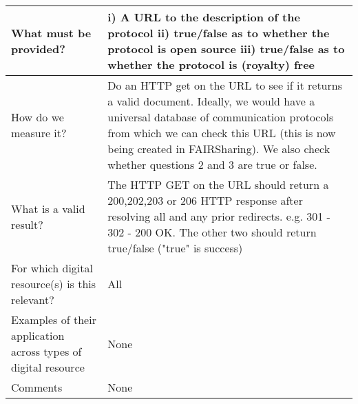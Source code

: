 \documentclass[english]{article}
\begin{document}
\begin{longtable}{|p{5cm}|p{9cm}|}
\hline
What must be provided? &  


i) A URL to the description of the protocol\newline  
ii) true/false as to whether the protocol is open source\newline 
iii) true/false as to whether the protocol is (royalty) free\newline 




\\



\hline
How do we measure it? &  

Do an HTTP get on the URL to see if it returns a valid document. Ideally, we would have a universal database of communication protocols from which we can check this URL (this is now being created in FAIRSharing). We also check whether questions 2 and 3 are true or false.  


\\



\hline
What is a valid result? &  



The HTTP GET on the URL should return a 200,202,203 or 206 HTTP response after resolving all and any prior redirects. e.g. 301 - 302 - 200 OK. The other two should return true/false ("true" is success)


\\



\hline
For which digital resource(s) is this relevant? &  All\\



\hline
Examples of their application across types of digital resource &  None

\\



\hline

Comments & None 

\\
\hline

\end{longtable}
\end{document}

